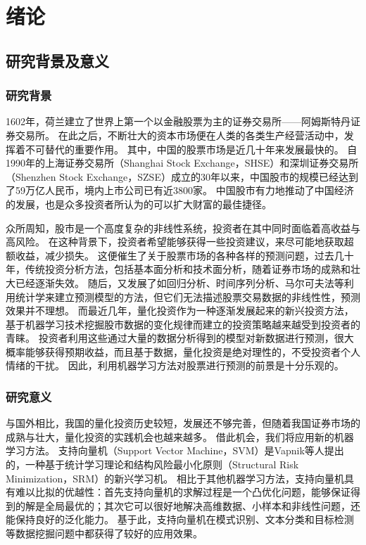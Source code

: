
\chapter{绪论}

\section{研究背景及意义}

\subsection{研究背景}

1602年，荷兰建立了世界上第一个以金融股票为主的证券交易所——阿姆斯特丹证券交易所。
在此之后，不断壮大的资本市场便在人类的各类生产经营活动中，发挥着不可替代的重要作用。
其中，中国的股票市场是近几十年来发展最快的。
自1990年的上海证券交易所（Shanghai Stock Exchange，SHSE）和深圳证券交易所（Shenzhen Stock Exchange，SZSE）成立的30年以来，中国股市的规模已经达到了59万亿人民币，境内上市公司已有近3800家。
中国股市有力地推动了中国经济的发展，也是众多投资者所认为的可以扩大财富的最佳捷径。

众所周知，股市是一个高度复杂的非线性系统，投资者在其中同时面临着高收益与高风险。
在这种背景下，投资者希望能够获得一些投资建议，来尽可能地获取超额收益，减少损失。
这便催生了关于股票市场的各种各样的预测问题，过去几十年，传统投资分析方法，包括基本面分析\cite{cn1}和技术面分析\cite{cn2}，随着证券市场的成熟和壮大已经逐渐失效。
随后，又发展了如回归分析、时间序列分析\cite{cn3}、马尔可夫法\cite{cn4}等利用统计学来建立预测模型的方法，但它们无法描述股票交易数据的非线性性，预测效果并不理想。
而最近几年，量化投资作为一种逐渐发展起来的新兴投资方法，基于机器学习技术挖掘股市数据的变化规律而建立的投资策略越来越受到投资者的青睐。
投资者利用这些通过大量的数据分析得到的模型对新数据进行预测，很大概率能够获得预期收益，而且基于数据，量化投资是绝对理性的，不受投资者个人情绪的干扰。
因此，利用机器学习方法对股票进行预测的前景是十分乐观的。

\subsection{研究意义}

与国外相比，我国的量化投资历史较短，发展还不够完善，但随着我国证券市场的成熟与壮大，量化投资的实践机会也越来越多。
借此机会，我们将应用新的机器学习方法。
支持向量机（Support Vector Machine，SVM）是Vapnik等人提出的，一种基于统计学习理论和结构风险最小化原则（Structural Risk Minimization，SRM）的新兴学习机\cite{en1}。
相比于其他机器学习方法，支持向量机具有难以比拟的优越性：首先支持向量机的求解过程是一个凸优化问题，能够保证得到的解是全局最优的；其次它可以很好地解决高维数据、小样本和非线性问题，还能保持良好的泛化能力。
基于此，支持向量机在模式识别、文本分类和目标检测等数据挖掘问题中都获得了较好的应用效果。

